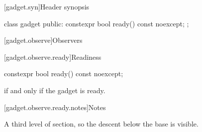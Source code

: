 [gadget.syn]{Header synopsis}

\begin{codeblock}
class gadget {
public:
  constexpr bool ready() const noexcept;
};
\end{codeblock}

\ifdefined\clausenumber{}\fi
{}[gadget.observe]{Observers}

[gadget.observe.ready]{Readiness}

\begin{itemdecl}
constexpr bool ready() const noexcept;
\end{itemdecl}

\begin{itemdescr}
\pnum
\returns
{} if and only if the gadget is ready.
\end{itemdescr}

[gadget.observe.ready.notes]{Notes}

\pnum
A third level of section, so the descent below the base is visible.
